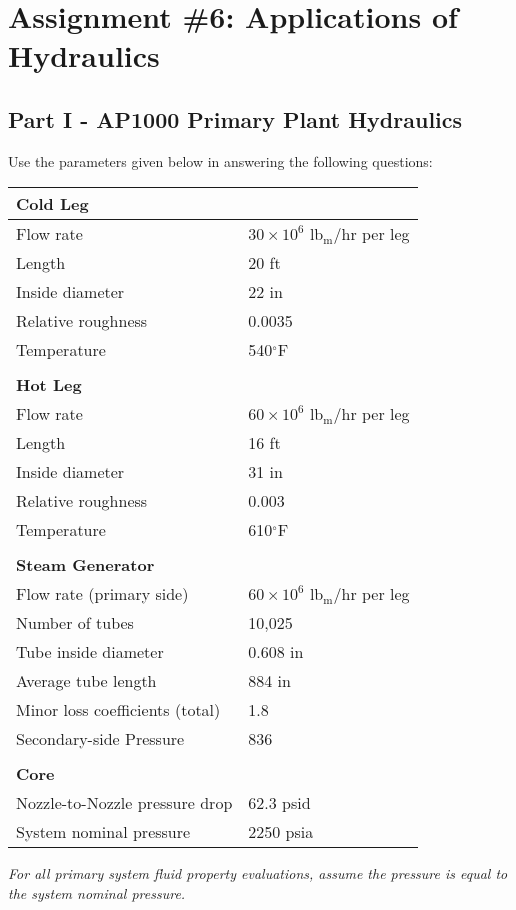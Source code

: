 \chapter{Assignment \#6: Applications of Hydraulics}
\label{ch:ass6}


\begin{fullwidth}
\section{Part I - AP1000 Primary Plant Hydraulics}
Use the parameters given below in answering the following questions:

\begin{table}
\begin{tabular}{ l | l }
\toprule
\textbf{Cold Leg} & \\
\hline
Flow rate & $30 \times 10^{6}$ lb$_{\text{m}}$/hr per leg \\
Length & 20 ft \\
Inside diameter & 22 in \\
Relative roughness & 0.0035 \\
Temperature & 540$^{\circ}$F \\

   & \\
\textbf{Hot Leg} & \\
\hline
Flow rate & $60 \times 10^{6}$ lb$_{\text{m}}$/hr per leg \\
Length & 16 ft \\
Inside diameter & 31 in \\
Relative roughness & 0.003 \\
Temperature & 610$^{\circ}$F \\
  & \\
\textbf{Steam Generator} & \\
\hline
Flow rate (primary side) & $60 \times 10^6$ lb$_{\text{m}}$/hr per leg \\
Number of tubes & 10,025 \\
Tube inside diameter & 0.608 in \\
Average tube length & 884 in \\
Minor loss coefficients (total) & 1.8 \\
Secondary-side Pressure & 836 \\
 & \\
\textbf{Core} & \\
\hline
Nozzle-to-Nozzle pressure drop & 62.3 psid \\
System nominal pressure & 2250 psia \\
\bottomrule
\end{tabular}
\end{table}
\emph{For all primary system fluid property evaluations, assume the pressure is equal to the system nominal pressure.}


\end{fullwidth}
